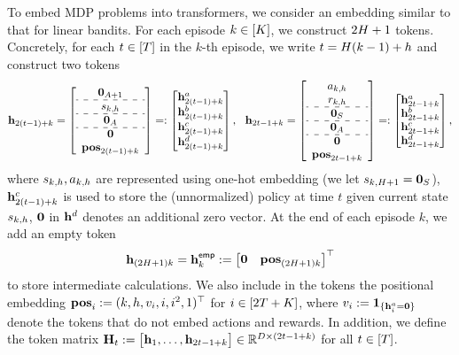 To embed MDP problems into transformers, we consider an embedding similar to that for linear bandits. For each episode $k\in[{K}]$, we construct $2{H}+1$ tokens. Concretely, for each $t\in[{T}]$ in the $k$-th episode, we write  $t={H}(k-1)+h$  and construct two tokens
\[
\begin{aligned}
\bh_{2(t-1)+k}=
\left[
\begin{array}{cc}
     \bzero_{\Numact+1} \\
     \hdashline 
     \state_{k,h}\\  
      \hdashline 
    \bzero_{\Numact}\\  
    \hdashline  
    \bzero\\
    \posv_{2(t-1)+k}
\end{array}\right]
=:
\begin{bmatrix}
     \bh_{2(t-1)+k}^{\parta} \\  \bh_{2(t-1)+k}^{\partb}\\  \bh_{2(t-1)+k}^{\partc}\\   \bh_{2(t-1)+k}^{\partd}\\
\end{bmatrix},~~
\bh_{2t-1+k}=
\left[
\begin{array}{cc}
     \action_{k,h} \\
      \reward_{k,h}\\  
      \hdashline 
      \bzero_{\Numst}\\ 
      \hdashline 
      \bzero_{\Numact}\\ 
     \hdashline  
      \bzero\\ 
      \posv_{2t-1+k}
\end{array}\right]=:
\begin{bmatrix}
    \bh_{2t-1+k}^{\parta} \\  \bh_{2t-1+k}^{\partb}\\   \bh_{2t-1+k}^{\partc}\\   \bh_{2t-1+k}^{\partd}
\end{bmatrix},
\end{aligned}
\]
where  ${s}_{k,h},{a}_{k,h}$ are represented using one-hot embedding (we let ${s}_{k,{H}+1}={\mathbf 0}_{S}$), ${\mathbf h}^{c}_{2(t-1)+k}$ is used to store the (unnormalized)  policy at time  $t$ given current state ${s}_{k,h}$, ${\mathbf 0}$ in ${\mathbf h}^{d}$ denotes an additional zero vector. At the end of each episode $k$, we add an empty token 
$$
{\mathbf h}_{(2{H}+1)k}={\mathbf h}^{{\mathsf{emp}}}_{k}:=\begin{bmatrix}
    {\mathbf 0} &{\mathbf{pos}}_{(2{H}+1)k}
\end{bmatrix}^\top
$$ to store intermediate calculations. We also include in the tokens  the positional embedding ${\mathbf{pos}}_i:=(k,h,v_i,i,i^2,1)^\top$ for $i\in[2{T}+{K}]$, where ${v}_i:={\mathbf 1}_{\{{\mathbf h}_i^{a}={\mathbf 0}\}}$  denote the tokens that do not embed actions and rewards.    In addition, we define  the token matrix ${\mathbf H}_t:=\begin{bmatrix}
    {\mathbf h}_1,\ldots,{\mathbf h}_{2t-1+k}
\end{bmatrix}\in\mathbb{R}^{D\times (2t-1+k)}$ for all $t\in[{T}]$.




